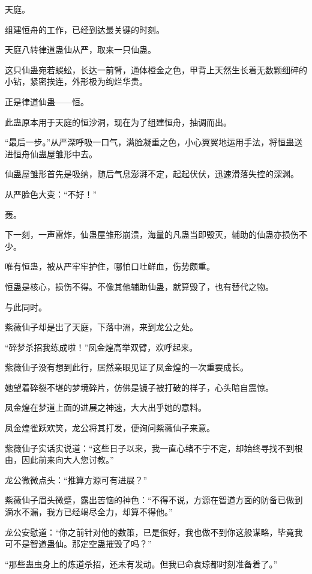 
\begin{this_body}

天庭。

组建恒舟的工作，已经到达最关键的时刻。

天庭八转律道蛊仙从严，取来一只仙蛊。

这只仙蛊宛若蜈蚣，长达一前臂，通体橙金之色，甲背上天然生长着无数颗细碎的小钻，紧密挨连，外形极为绚烂华贵。

正是律道仙蛊——恒。

此蛊原本用于天庭的恒沙洞，现在为了组建恒舟，抽调而出。

“最后一步。”从严深呼吸一口气，满脸凝重之色，小心翼翼地运用手法，将恒蛊送进恒舟仙蛊屋雏形中去。

仙蛊屋雏形首先是吸纳，随后气息澎湃不定，起起伏伏，迅速滑落失控的深渊。

从严脸色大变：“不好！”

轰。

下一刻，一声雷炸，仙蛊屋雏形崩溃，海量的凡蛊当即毁灭，辅助的仙蛊亦损伤不少。

唯有恒蛊，被从严牢牢护住，哪怕口吐鲜血，伤势颇重。

恒蛊是核心，损伤不得。不像其他辅助仙蛊，就算毁了，也有替代之物。

与此同时。

紫薇仙子却是出了天庭，下落中洲，来到龙公之处。

“碎梦杀招我练成啦！”凤金煌高举双臂，欢呼起来。

紫薇仙子没有想到此行，居然亲眼见证了凤金煌的一次重要成长。

她望着碎裂不堪的梦境碎片，仿佛是镜子被打破的样子，心头暗自震惊。

凤金煌在梦道上面的进展之神速，大大出乎她的意料。

凤金煌雀跃欢笑，龙公将其打发，便询问紫薇仙子来意。

紫薇仙子实话实说道：“这些日子以来，我一直心绪不宁不定，却始终寻找不到根由，因此前来向大人您讨教。”

龙公微微点头：“推算方源可有进展？”

紫薇仙子眉头微蹙，露出苦恼的神色：“不得不说，方源在智道方面的防备已做到滴水不漏，我方已经竭尽全力，却算不得他。”

龙公安慰道：“你之前针对他的数策，已是很好，我也做不到你这般谋略，毕竟我可不是智道蛊仙。那定空蛊摧毁了吗？”

“那些蛊虫身上的炼道杀招，还未有发动。但我已命袁琼都时刻准备着了。”


\end{this_body}

